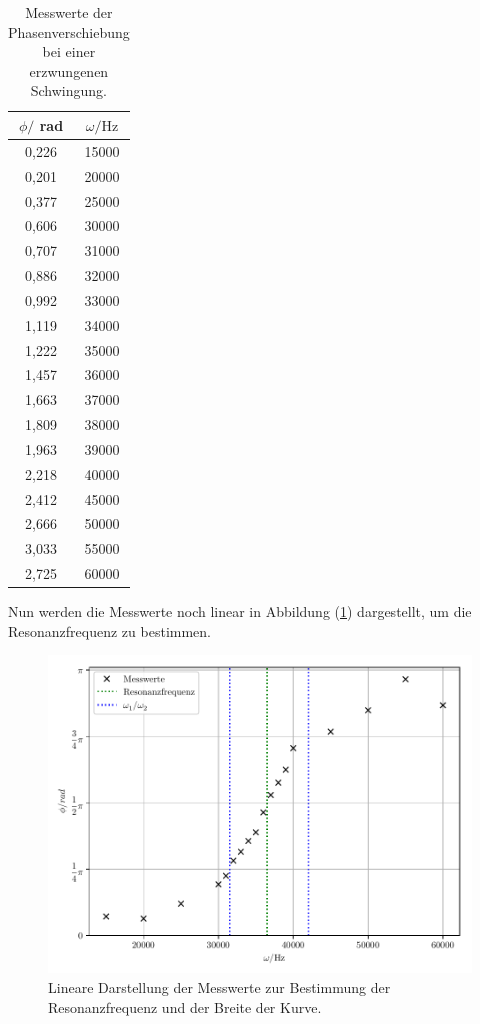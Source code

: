 \begin{table}[H]
  \centering
  \caption{Messwerte der Phasenverschiebung bei einer erzwungenen Schwingung.}
  \label{tab:3}
  \begin{tabular}{c c}
    \toprule
    $\phi /$ rad & $ \omega / \si{\Hz}$ \\
    \midrule
    0,226 &  15000 \\
    0,201 &  20000 \\
    0,377 &  25000 \\
    0,606 &  30000 \\
    0,707 &  31000 \\
    0,886 &  32000 \\
    0,992 &  33000 \\
    1,119 &  34000 \\
    1,222 &  35000 \\
    1,457 &  36000 \\
    1,663 &  37000 \\
    1,809 &  38000 \\
    1,963 &  39000 \\
    2,218 &  40000 \\
    2,412 &  45000 \\
    2,666 &  50000 \\
    3,033 &  55000 \\
    2,725 &  60000 \\
    \bottomrule
  \end{tabular}
\end{table}

Nun werden die Messwerte noch linear in Abbildung (\ref{fig:11}) dargestellt, um die Resonanzfrequenz zu bestimmen.

\begin{figure}[H]
  \centering
  \includegraphics[width=\textwidth]{plot5.pdf}
  \caption{Lineare Darstellung der Messwerte zur Bestimmung der Resonanzfrequenz und der
  Breite der Kurve.}
  \label{fig:11}
\end{figure}

